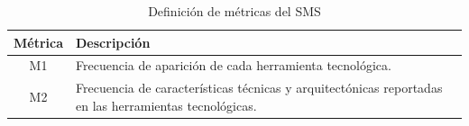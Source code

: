 \begin{table}[H]
	\centering
	\caption{Definición de métricas del SMS}
	\label{tab:metricas}

	\renewcommand{\arraystretch}{1.2}
	\fontsize{9pt}{10pt}\selectfont

	\begin{tabularx}{\textwidth}{|c|X|}
		\hline
		\textbf{Métrica} &
		\textbf{Descripción}
		\\
		\hline
		M1               &
		Frecuencia de aparición de cada herramienta tecnológica.
		\\
		\hline
		M2               &
		Frecuencia de características técnicas y arquitectónicas reportadas en las herramientas tecnológicas.
		\\
		\hline
	\end{tabularx}
\end{table}
